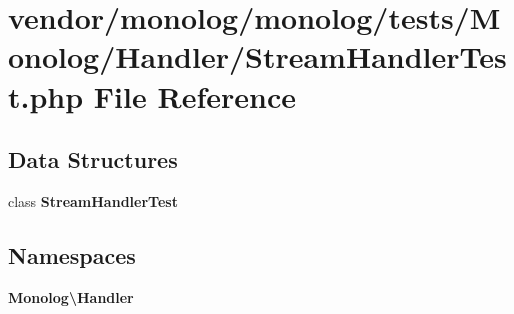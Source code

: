 \section{vendor/monolog/monolog/tests/\+Monolog/\+Handler/\+Stream\+Handler\+Test.php File Reference}
\label{_stream_handler_test_8php}
\subsection*{Data Structures}
\begin{DoxyCompactItemize}
\item 
class {\bf Stream\+Handler\+Test}
\end{DoxyCompactItemize}
\subsection*{Namespaces}
\begin{DoxyCompactItemize}
\item 
 {\bf Monolog\textbackslash{}\+Handler}
\end{DoxyCompactItemize}
